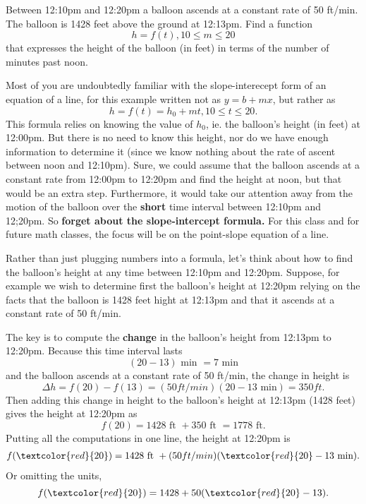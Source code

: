\documentclass{ximera}
\begin{document}
\begin{example} \label{Ex2:LF}
Between 12:10pm and 12:20pm a balloon ascends at a constant rate of 50 ft/min. The balloon is 1428 feet above the ground at 12:13pm. Find a function 
\[
  h = f(t), 10\leq m \leq 20
\]
that expresses the height of the balloon (in feet) in terms of the number of minutes past noon.


\begin{explanation}
Most of you are undoubtedly familiar with the slope-interecept form of an equation of a line, for this example written not as $y=b+mx$, but rather as 
\[
    h=f(t) =h_0 + m t , 10\leq t \leq 20.
\]
This formula relies on knowing the value of $h_0$, ie. the balloon's height (in feet) at 12:00pm. But there is no need to know this height, nor do we have enough information to determine it (since we know nothing about the rate of ascent between noon and 12:10pm). Sure, we could assume that the balloon ascends at a constant rate from 12:00pm to 12:20pm and find the height at noon, but that would be an extra step. Furthermore, it would take our attention away from the motion of the balloon over the {\bf short} time interval between 12:10pm and 12;20pm. So {\bf forget about the slope-intercept formula.} For this class and for future math classes, the focus will be on the point-slope equation of a line.

Rather than just plugging numbers into a formula, let's think about how to find the balloon's height at any time between 12:10pm and 12:20pm. Suppose, for example we wish to determine first the balloon's height at 12:20pm relying on the facts that the balloon is 1428 feet hight at 12:13pm and that it ascends at a constant rate of 50 ft/min. 

The key is to compute the {\bf change} in the balloon's height from 12:13pm to 12:20pm. Because this time interval lasts 
\[
   (20 - 13) \text{ min } = 7 \text { min}
\]
and the balloon ascends at a constant rate of 50 ft/min, the change in height is %
\[
  \Delta h = f(20) - f(13) = (50 ft/min)(20 - 13 \text{ min})  = 350 ft .
\]
Then adding this change in height to the balloon's height at 12:13pm (1428 feet) gives the height at 12:20pm as
\[
   f(20) = 1428 \text{ ft } + 350 \text{ ft } = 1778 \text{ ft}.
\]
Putting all the computations in one line, the height at 12:20pm is
\begin{align*}
    f(\textcolor{red}{20}) &= 1428 \text{ ft } + (50 ft/min)( \textcolor{red}{20} - 13 \text{ min}) . \\
\end{align*}
Or omitting the units, 
\[
     f(\textcolor{red}{20}) = 1428  + 50 ( \textcolor{red}{20} - 13 ) . 
\]



\end{explanation}
\end{example}
\end{document}
